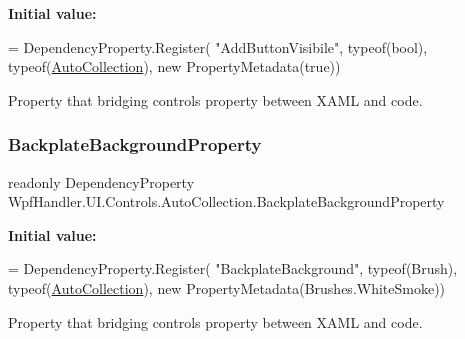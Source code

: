 {\bfseries Initial value\+:}
\begin{DoxyCode}
= DependencyProperty.Register(
          \textcolor{stringliteral}{"AddButtonVisibile"}, typeof(\textcolor{keywordtype}{bool}), typeof(\mbox{\hyperlink{class_wpf_handler_1_1_u_i_1_1_controls_1_1_auto_collection_a8bc71a7c43dfeca1d6ff113b12088c28}{AutoCollection}}),
          \textcolor{keyword}{new} PropertyMetadata(\textcolor{keyword}{true}))
\end{DoxyCode}


Property that bridging control\textquotesingle{}s property between X\+A\+ML and code. 

\mbox{\label{class_wpf_handler_1_1_u_i_1_1_controls_1_1_auto_collection_ad8966a126d82307e2796bba38737518e}} 
\subsubsection{\texorpdfstring{Backplate\+Background\+Property}{BackplateBackgroundProperty}}
{\footnotesize\ttfamily readonly Dependency\+Property Wpf\+Handler.\+U\+I.\+Controls.\+Auto\+Collection.\+Backplate\+Background\+Property\hspace{0.3cm}{\ttfamily [static]}}

{\bfseries Initial value\+:}
\begin{DoxyCode}
= DependencyProperty.Register(
          \textcolor{stringliteral}{"BackplateBackground"}, typeof(Brush), typeof(\mbox{\hyperlink{class_wpf_handler_1_1_u_i_1_1_controls_1_1_auto_collection_a8bc71a7c43dfeca1d6ff113b12088c28}{AutoCollection}}),
          \textcolor{keyword}{new} PropertyMetadata(Brushes.WhiteSmoke))
\end{DoxyCode}


Property that bridging control\textquotesingle{}s property between X\+A\+ML and code. 

\mbox{\label{class_wpf_handler_1_1_u_i_1_1_controls_1_1_auto_collection_a7f269c1eaefddc9f23e9aa7c523740de}} 

